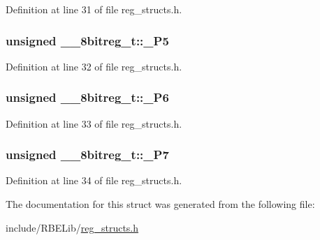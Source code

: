 Definition at line 31 of file reg\-\_\-structs.\-h.

\hypertarget{struct____8bitreg__t_a4a51fd205ff67d3523e92697adc2fc86}{
\subsubsection[{\-\_\-\-P5}]{\setlength{\rightskip}{0pt plus 5cm}unsigned \-\_\-\-\_\-8bitreg\-\_\-t\-::\-\_\-\-P5}}\label{struct____8bitreg__t_a4a51fd205ff67d3523e92697adc2fc86}


Definition at line 32 of file reg\-\_\-structs.\-h.

\hypertarget{struct____8bitreg__t_aa3a7604eeb889d347ef856be027dc6ba}{
\subsubsection[{\-\_\-\-P6}]{\setlength{\rightskip}{0pt plus 5cm}unsigned \-\_\-\-\_\-8bitreg\-\_\-t\-::\-\_\-\-P6}}\label{struct____8bitreg__t_aa3a7604eeb889d347ef856be027dc6ba}


Definition at line 33 of file reg\-\_\-structs.\-h.

\hypertarget{struct____8bitreg__t_aae126f699a2181048e367daeaa2abc3f}{
\subsubsection[{\-\_\-\-P7}]{\setlength{\rightskip}{0pt plus 5cm}unsigned \-\_\-\-\_\-8bitreg\-\_\-t\-::\-\_\-\-P7}}\label{struct____8bitreg__t_aae126f699a2181048e367daeaa2abc3f}


Definition at line 34 of file reg\-\_\-structs.\-h.



The documentation for this struct was generated from the following file\-:\begin{DoxyCompactItemize}
\item 
include/\-R\-B\-E\-Lib/\hyperlink{reg__structs_8h}{reg\-\_\-structs.\-h}\end{DoxyCompactItemize}
